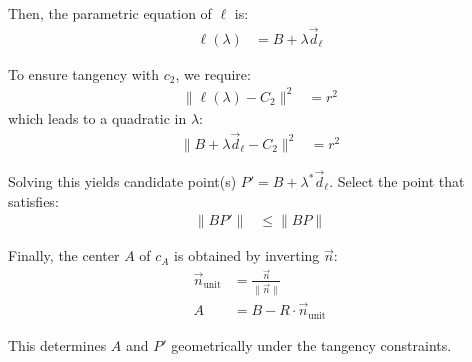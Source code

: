 \documentclass[11pt]{article}
\begin{document}
Then, the parametric equation of $\ell$ is:
\begin{align*}
    \ell(\lambda) &= B + \lambda \vec{d}_\ell
\end{align*}

To ensure tangency with $c_2$, we require:
\begin{align*}
    \|\ell(\lambda) - C_2\|^2 &= r^2
\end{align*}
which leads to a quadratic in $\lambda$:
\begin{align*}
    \|B + \lambda \vec{d}_\ell - C_2\|^2 &= r^2
\end{align*}

Solving this yields candidate point(s) $P' = B + \lambda^* \vec{d}_\ell$.
Select the point that satisfies:
\begin{align*}
    \|BP'\| &\leq \|BP\|
\end{align*}

Finally, the center $A$ of $c_A$ is obtained by inverting $\vec{n}$:
\begin{align*}
    \vec{n}_{\text{unit}} &= \frac{\vec{n}}{\|\vec{n}\|} \\
    A &= B - R \cdot \vec{n}_{\text{unit}}
\end{align*}

This determines $A$ and $P'$ geometrically under the tangency constraints.
\end{document}
